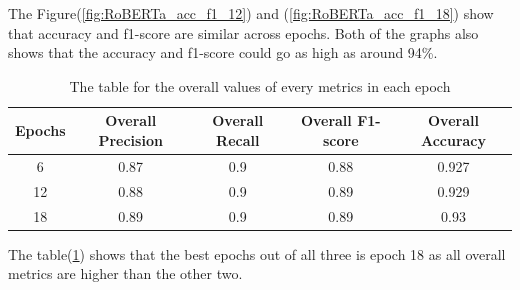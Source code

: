 The Figure(\ref{fig:RoBERTa_acc_f1_12}) and (\ref{fig:RoBERTa_acc_f1_18}) show that accuracy and f1-score are similar across epochs. Both of the graphs also shows that the accuracy and f1-score could go as high as around 94\%.  

\begin{table}[h!]
    \centering
    \begin{tabular}{|c|c|c|c|c|}\hline
          Epochs  & Overall Precision & Overall Recall & Overall F1-score & Overall Accuracy\\\hline
           6 & 0.87 & 0.9 & 0.88 & 0.927\\\hline
           12 &  0.88 & 0.9 & 0.89 & 0.929\\\hline
           18 & 0.89 & 0.9 & 0.89 & 0.93\\\hline
    \end{tabular}
    \caption{The table for the overall values of every metrics in each epoch}
    \label{tab:overall_metrics_rob}
\end{table}

The table(\ref{tab:overall_metrics_rob}) shows that the best epochs out of all three is epoch 18 as all overall metrics are higher than the other two.

